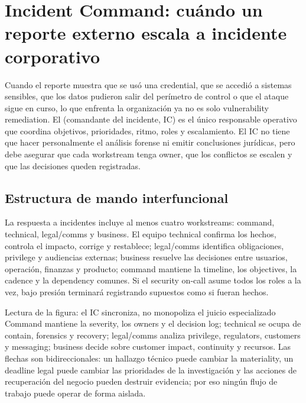 \section{Incident Command: cuándo un reporte externo escala a incidente corporativo}

Cuando el reporte muestra que se usó una credential, que se accedió a sistemas sensibles, que los datos pudieron salir del perímetro de control o que el ataque sigue en curso, lo que enfrenta la organización ya no es solo vulnerability remediation. El  (comandante del incidente, IC) es el único responsable operativo que coordina objetivos, prioridades, ritmo, roles y escalamiento. El IC no tiene que hacer personalmente el análisis forense ni emitir conclusiones jurídicas, pero debe asegurar que cada workstream tenga owner, que los conflictos se escalen y que las decisiones queden registradas.

\subsection{Estructura de mando interfuncional}

La respuesta a incidentes incluye al menos cuatro workstreams: command, technical, legal/comms y business. El equipo technical confirma los hechos, controla el impacto, corrige y restablece; legal/comms identifica obligaciones, privilege y audiencias externas; business resuelve las decisiones entre usuarios, operación, finanzas y producto; command mantiene la timeline, los objectives, la cadence y la dependency comunes. Si el security on-call asume todos los roles a la vez, bajo presión terminará registrando supuestos como si fueran hechos.


\begin{knowledgebox}{Lectura de la figura: el IC sincroniza, no monopoliza el juicio especializado}
Command mantiene la severity, los owners y el decision log; technical se ocupa de contain, forensics y recovery; legal/comms analiza privilege, regulators, customers y messaging; business decide sobre customer impact, continuity y recursos. Las flechas son bidireccionales: un hallazgo técnico puede cambiar la materiality, un deadline legal puede cambiar las prioridades de la investigación y las acciones de recuperación del negocio pueden destruir evidencia; por eso ningún flujo de trabajo puede operar de forma aislada.
\end{knowledgebox}

